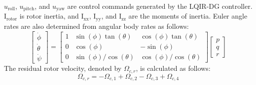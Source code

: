 \documentclass[3p]{elsarticle}
\begin{document}
$u_{\text{roll}}$, $u_{\text{pitch}}$, and $u_{\text{yaw}}$ are control commands generated by the LQIR-DG controller. $\mathrm{I}_{\text{rotor}}$ is rotor inertia, and $\mathrm{I}_{\text{xx}}$, $\mathrm{I}_{\text{yy}}$, and $\mathrm{I}_{\text{zz}}$ are the moments of inertia.
Euler angle rates are also determined from angular body rates as follows:
\begin{equation}
	\begin{bmatrix}
	\dot\phi \\
	\dot\theta \\
	\dot\psi
	\end{bmatrix} = 
	\begin{bmatrix}
	1 & \sin(\phi)\tan(\theta) & \cos(\phi)\tan(\theta) \\
	0 & \cos(\phi) & -\sin(\phi) \\
	0 & \sin(\phi)/\cos(\theta) & \cos(\phi)/\cos(\theta)
	\end{bmatrix}
	\begin{bmatrix}
	p \\
	q \\
	r
	\end{bmatrix}
\end{equation}
The residual rotor velocity, denoted by $\Omega_{c,r}$, is calculated as follows:
\begin{equation}
	\Omega_{c, r} = -\Omega_{c, 1} + \Omega_{c, 2} - \Omega_{c, 3} + \Omega_{c, 4}
\end{equation}
\end{document}
